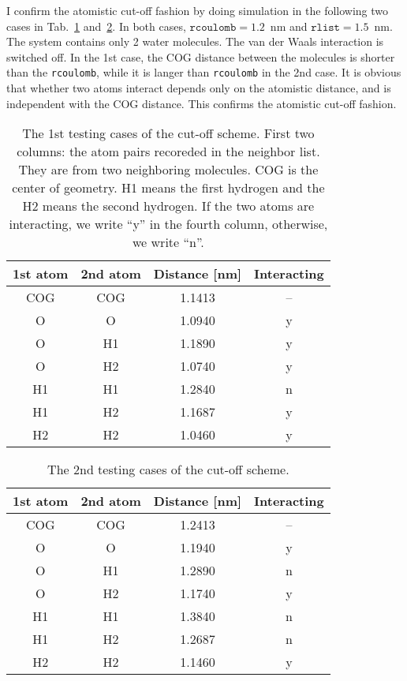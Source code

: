 \documentclass[aps,pre,preprint]{revtex4-1}
\newcommand{\rlist}[0]{\texttt{rlist}}
\newcommand{\rcoulomb}[0]{\texttt{rcoulomb}}
\begin{document}
I confirm the atomistic cut-off fashion by doing simulation in the
following two cases in Tab.~\ref{tab:tmp1} and~\ref{tab:tmp2}. In both cases, $\rcoulomb
= 1.2$~nm and $\rlist=1.5$~nm. The system contains only 2 water molecules.
The van der Waals interaction is switched off.
In the 1st case, the COG distance between the molecules is shorter than
the \rcoulomb, while it is langer than \rcoulomb{} in the 2nd case.
It is obvious that whether two atoms interact depends only on the atomistic
distance, and is independent with the COG distance. This confirms the
atomistic cut-off fashion.
\begin{table}
  \centering
  \caption{The 1st testing cases of the cut-off scheme. First two columns: the atom pairs recoreded in the neighbor list.
    They are from two neighboring molecules.
    COG is the center of geometry. H1 means the first hydrogen and the H2 means the second hydrogen.
    If the two atoms are interacting, we write ``y'' in the fourth column, otherwise, we write ``n''.
  }
  \label{tab:tmp1}
  \begin{tabular*}{0.8\textwidth}{@{\extracolsep{\fill}}cccc}\hline\hline
    1st atom  & 2nd atom & Distance [nm] & Interacting \\\hline
    COG & COG &  1.1413 & --\\
    O	&O	&1.0940	&y \\
    O	&H1	&1.1890	&y \\
    O	&H2	&1.0740	&y \\
    H1	&H1 	&1.2840	&n \\
    H1	&H2 	&1.1687	&y \\
    H2	&H2	&1.0460	&y \\
    \hline\hline
  \end{tabular*}
\end{table}

\begin{table}
  \centering
  \caption{The 2nd testing cases of the cut-off scheme. }
  \label{tab:tmp2}
  \begin{tabular*}{0.8\textwidth}{@{\extracolsep{\fill}}cccc}\hline\hline
    1st atom  & 2nd atom & Distance [nm] & Interacting \\\hline
    COG & COG &  1.2413 & --\\
    O	&O	&1.1940	&y \\
    O	&H1	&1.2890	&n \\
    O	&H2	&1.1740	&y \\
    H1	&H1 	&1.3840	&n \\
    H1	&H2 	&1.2687	&n \\
    H2	&H2	&1.1460	&y \\
    \hline\hline
  \end{tabular*}
\end{table}
\end{document}
